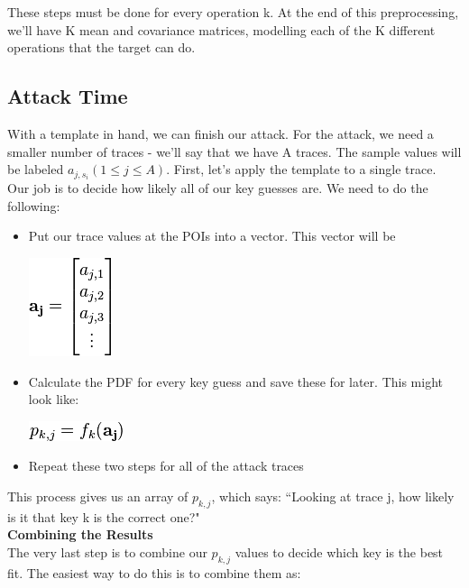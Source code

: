 \begin{itemize}
    \end{itemize}
    
    These steps must be done for every operation k. At the end of this preprocessing, we'll have K mean and covariance matrices, modelling each of the K different operations that the target can do.

    \subsection{Attack Time}
    With a template in hand, we can finish our attack. For the attack, we need a smaller number of traces - we'll say that we have A traces. The sample values will be labeled $a_{j, s_i} (1 \le j \le A)$.
    First, let's apply the template to a single trace. Our job is to decide how likely all of our key guesses are. We need to do the following:
    \begin{itemize}
      \item Put our trace values at the POIs into a vector. This vector will be
       \begin{minipage}{\linewidth}
      \centering
      \includegraphics{images/Lecture_5/pic6.png}
      \end{minipage}
       
      \item Calculate the PDF for every key guess and save these for later. This might look like:
      \begin{minipage}{\linewidth}
      \centering
      \includegraphics{images/Lecture_5/pic7.png}
      \end{minipage}
      \item Repeat these two steps for all of the attack traces
    \end{itemize}
    This process gives us an array of $p_{k, j}$, which says: ``Looking at trace j, how likely is it that key k is the correct one?"\\
    \textbf{Combining the Results}\\
    The very last step is to combine our $p_{k, j}$ values to decide which key is the best fit. The easiest way to do this is to combine them as:
    
